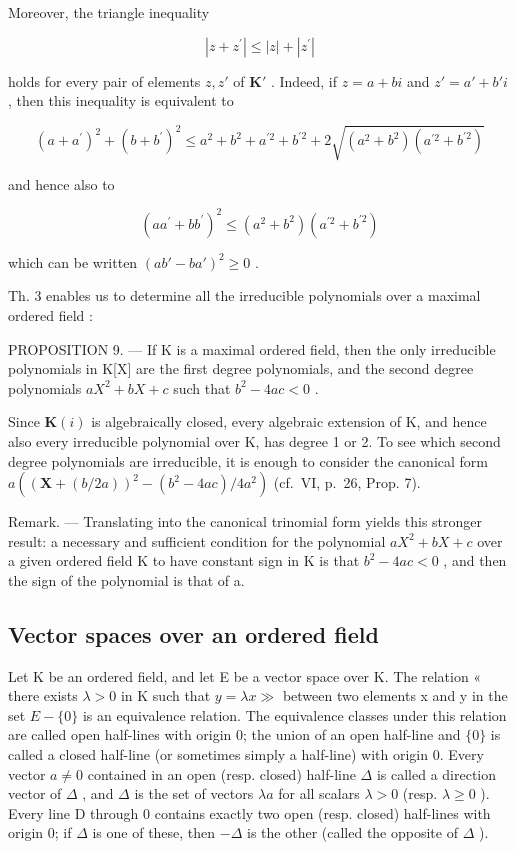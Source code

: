 Moreover, the triangle inequality

\[
\left| z + z ^ {\prime} \right| \leqslant \left| z \right| + \left| z ^ {\prime} \right|
\]

holds for every pair of elements \(z, z'\) of \(\mathbf{K}'\) . Indeed, if \(z = a + bi\) and \(z' = a' + b'i\) , then this inequality is equivalent to

\[
(a + a ^ {\prime}) ^ {2} + (b + b ^ {\prime}) ^ {2} \leqslant a ^ {2} + b ^ {2} + a ^ {\prime 2} + b ^ {\prime 2} + 2 \sqrt {(a ^ {2} + b ^ {2}) (a ^ {\prime 2} + b ^ {\prime 2})}
\]

and hence also to

\[
(a a ^ {\prime} + b b ^ {\prime}) ^ {2} \leqslant (a ^ {2} + b ^ {2}) (a ^ {\prime 2} + b ^ {\prime 2})
\]

which can be written \((ab' - ba')^2 \geqslant 0\) .

Th. 3 enables us to determine all the irreducible polynomials over a maximal ordered field :

PROPOSITION 9. --- If K is a maximal ordered field, then the only irreducible polynomials in K{[}X{]} are the first degree polynomials, and the second degree polynomials \(aX^{2} + bX + c\) such that \(b^{2} - 4ac < 0\) .

Since \(\mathbf{K}(i)\) is algebraically closed, every algebraic extension of K, and hence also every irreducible polynomial over K, has degree 1 or 2. To see which second degree polynomials are irreducible, it is enough to consider the canonical form \(a((\mathbf{X} + (b/2a))^2 - (b^2 - 4ac)/4a^2)\) (cf.~VI, p.~26, Prop. 7).

Remark. --- Translating into the canonical trinomial form yields this stronger result: a necessary and sufficient condition for the polynomial \(aX^{2} + bX + c\) over a given ordered field K to have constant sign in K is that \(b^{2} - 4ac < 0\) , and then the sign of the polynomial is that of a.

\subsection{Vector spaces over an ordered field}

Let K be an ordered field, and let E be a vector space over K. The relation « there exists \(\lambda > 0\) in K such that \(y = \lambda x \gg\) between two elements x and y in the set \(E - \{0\}\) is an equivalence relation. The equivalence classes under this relation are called open half-lines with origin 0; the union of an open half-line and \(\{0\}\) is called a closed half-line (or sometimes simply a half-line) with origin 0. Every vector \(a \neq 0\) contained in an open (resp. closed) half-line \(\Delta\) is called a direction vector of \(\Delta\) , and \(\Delta\) is the set of vectors \(\lambda a\) for all scalars \(\lambda > 0\) (resp. \(\lambda \geqslant 0\) ). Every line D through 0 contains exactly two open (resp. closed) half-lines with origin 0; if \(\Delta\) is one of these, then \(-\Delta\) is the other (called the opposite of \(\Delta\) ).

